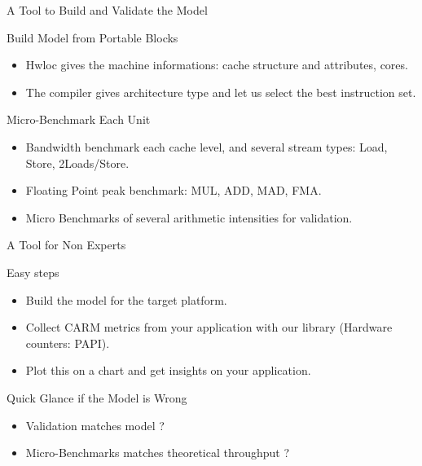 \begin{nframe}{A Tool to Build and Validate the Model}
  \begin{block}{Build Model from Portable Blocks}
    \begin{itemize}
    \item Hwloc gives the machine informations: cache structure and attributes, cores.
    \item The compiler gives architecture type and let us select the best instruction set.
    \end{itemize}
  \end{block}

  \begin{block}{Micro-Benchmark Each Unit}
    \begin{itemize}
    \item Bandwidth benchmark each cache level, and several stream types: Load, Store, 2Loads/Store.
    \item Floating Point peak benchmark: MUL, ADD, MAD, FMA.
    \item Micro Benchmarks of several arithmetic intensities for validation.
    \end{itemize}
  \end{block}
\end{nframe}

\begin{nframe}{A Tool for Non Experts}
  \begin{block}{Easy steps}
    \begin{itemize}
    \item Build the model for the target platform.
    \item Collect CARM metrics from your application with our library (Hardware counters: PAPI).
    \item Plot this on a chart and get insights on your application.
    \end{itemize}
  \end{block}

  \begin{block}{Quick Glance if the Model is Wrong}
    \begin{itemize}
    \item Validation matches model ?
    \item Micro-Benchmarks matches theoretical throughput ?
    \end{itemize}
  \end{block}
\end{nframe}


